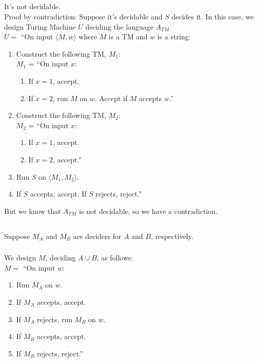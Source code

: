 \documentclass{article}
\begin{document}
\subsection{}
It's not decidable.\\
Proof by contradiction:
Suppose it's decidable and \(S\) decides it.
In this case, we design Turing Machine \(U\) deciding the language \(A_{TM}\).\\
\(U = \) ``On input \(\langle M,w \rangle\) where \(M\) is a TM and \(w\) is a string:
\begin{enumerate}[label=\(\arabic*.\)]
\item Construct the following TM, \(M_1\):\\
\(M_1\) = ``On input \(x\):
\begin{enumerate}[label=\(\arabic*.\)]
\item If \(x=1\), accept.
\item If \(x=2\), run \(M\) on \(w\). Accept if \(M\) accepts \(w\).''
\end{enumerate}
\item Construct the following TM, \(M_2\):\\
\(M_2\) = ``On input \(x\):
\begin{enumerate}[label=\(\arabic*.\)]
\item If \(x=1\), accept.
\item If \(x=2\), accept.''
\end{enumerate}
\item Run \(S\) on \(\langle M_1, M_2 \rangle\).
\item If \(S\) accepts, accept. If \(S\) rejects, reject.''
\end{enumerate}

But we know that \(A_{TM}\) is not decidable, so we have a contradiction.

\subsection{}
Suppose \(M_A\) and \(M_B\) are deciders for \(A\) and \(B\), respectively.
\subsubsection{}
We design \(M\), deciding \(A \cup B\), as follows:\\
\(M = \) ``On input \(w\):
\begin{enumerate}
\item Run \(M_A\) on \(w\).
\item If \(M_A\) accepts, accept.
\item If \(M_A\) rejects, run \(M_B\) on \(w\).
\item If \(M_B\) accepts, accept.
\item If \(M_B\) rejects, reject.''
\end{enumerate}
\end{document}
